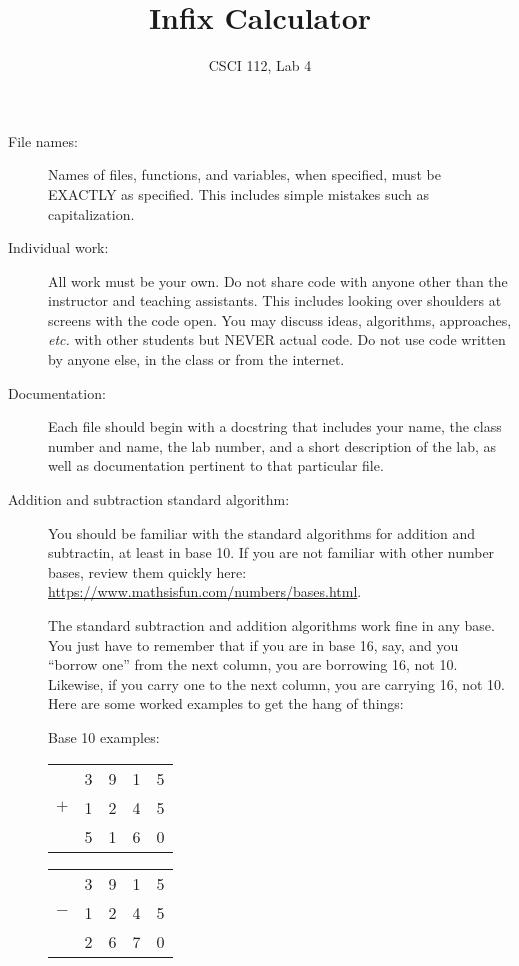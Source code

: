 \documentclass{article}
\title{Infix Calculator}
\author{CSCI 112, Lab 4}
\date{}
\begin{document}
\sloppy

\maketitle

\begin{description} 
\item[File names:]  Names of files, functions, and variables, 
when specified,
must be EXACTLY as specified.  This includes simple mistakes such
as capitalization.

\item[Individual work:]  All work must be your own.  Do not share
code with anyone other than the instructor and teaching assistants.
This includes looking over shoulders at screens with the code open.
You may discuss ideas, algorithms, approaches, {\em etc.} with
other students but NEVER actual code.  Do not use code
written by anyone else, in the class or from the internet.

\item[Documentation:] Each file should begin with a docstring
that includes your name, the class number and name, the lab
number, and  
a short description of the lab, as well as documentation pertinent
to that particular file.

\item[Addition and subtraction standard algorithm:]  You should be
familiar with the standard algorithms for addition and subtractin,
at least in base 10.  If you are not familiar with other number bases,
review them quickly here: \url{https://www.mathsisfun.com/numbers/bases.html}.

The standard subtraction and addition algorithms work fine in any
base.  You just have to remember that if you are in base 16, say,
and you ``borrow one'' from the next column, you are borrowing 16,
not 10.  Likewise, if you carry one to the next column, you are
carrying 16, not 10.  Here are some worked examples to get
the hang of things:

Base 10 examples:\hfill
\begin{tabular}{rrrrr}
  &3 &9 &1 &5\\
$+$ &1 &2 &4 &5\\
\hline
  &5 &1 &6 &0\\
\end{tabular}\hfill
\begin{tabular}{rrrrr}
  &3 &9 &1 &5\\
$-$ &1 &2 &4 &5\\
\hline
  &2 &6 &7 &0\\
\end{tabular}


\end{description}
\end{document}
